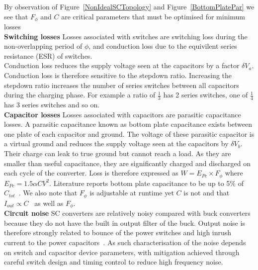 \documentclass[letterpaper,twocolumn,10pt]{article}
\begin{document}
By observation of Figure~\ref{NonIdealSCTopology} and Figure~\ref{BottomPlatePar} we see that $F_\phi$ and $C$ are critical parameters that must be optimised for minimum losses\\
\textbf{Switching losses }Losses associated with switches are switching loss during the non-overlapping period of $\phi$, and conduction loss due to the equivilent series resistance (ESR) of switches.\\
Conduction loss reduces the supply voltage seen at the capacitors by a factor $\delta V_a$. Conduction loss is therefore sensitive to the stepdown ratio. Increasing the stepdown ratio increases the number of series switches between all capacitors during the charging phase. For example a ratio of $\frac{1}{3}$ has 2 series switches, one of $\frac{1}{4}$ has 3 series switches and so on.\\
\textbf{Capacitor losses }Losses associated with capacitors are parasitic capacitance losses. A parasitic capacitance known as bottom plate capacitance exists between one plate of each capacitor and ground. The voltage of these parasitic capacitor is a virtual ground and reduces the supply voltage seen at the capacitors by $\delta V_b$. Their charge can leak to true ground but cannot reach a load. As they are smaller than useful capacitance, they are significantly charged and discharged on each cycle of the converter. Loss is therefore expressed as $W = E_{Pc} \times F_\phi$ where $E_{Pc} = 1.5\alpha CV^2$. Literature reports bottom plate capacitance to be up to 5\% of $C_{tot}$~\cite{Ramadass2007}. We also note that $F_\phi$ is adjustable at runtime yet $C$ is not and that $I_{out} \propto C$~\cite{Damak2013} as well as $F_\phi$.\\
\textbf{Circuit noise }SC converters are relatively noisy compared with buck converters because they do not have the built in output filter of the buck. Output noise is therefore strongly related to bounce of the power switches and high inrush current to the power capacitors~\cite{Zheng2013}. As such characterisation of the noise depends on switch and capacitor device parameters, with mitigation achieved through careful switch design and timing control to reduce high frequency noise. 
\end{document}
